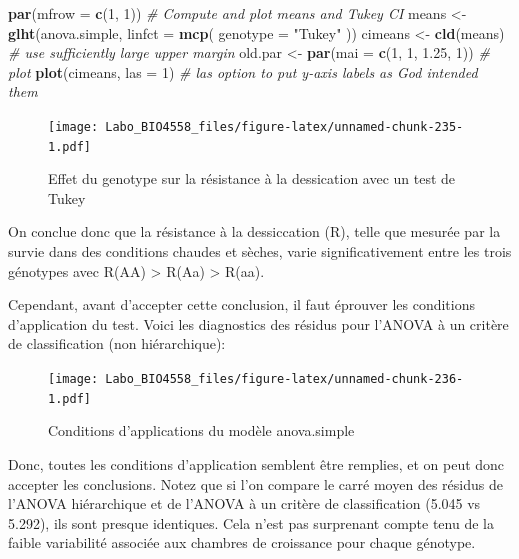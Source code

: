 \documentclass[
  12pt,
]{book}
\newenvironment{Shaded}{\begin{snugshade}}{\end{snugshade}}
\newcommand{\CommentTok}[1]{\textcolor[rgb]{0.56,0.35,0.01}{\textit{#1}}}
\newcommand{\DataTypeTok}[1]{\textcolor[rgb]{0.13,0.29,0.53}{#1}}
\newcommand{\DecValTok}[1]{\textcolor[rgb]{0.00,0.00,0.81}{#1}}
\newcommand{\FloatTok}[1]{\textcolor[rgb]{0.00,0.00,0.81}{#1}}
\newcommand{\KeywordTok}[1]{\textcolor[rgb]{0.13,0.29,0.53}{\textbf{#1}}}
\newcommand{\NormalTok}[1]{#1}
\newcommand{\StringTok}[1]{\textcolor[rgb]{0.31,0.60,0.02}{#1}}
\begin{document}
\begin{Shaded}
\begin{Highlighting}[]
\KeywordTok{par}\NormalTok{(}\DataTypeTok{mfrow =} \KeywordTok{c}\NormalTok{(}\DecValTok{1}\NormalTok{, }\DecValTok{1}\NormalTok{))}
\CommentTok{\# Compute and plot means and Tukey CI}
\NormalTok{means \textless{}{-}}\StringTok{ }\KeywordTok{glht}\NormalTok{(anova.simple, }\DataTypeTok{linfct =} \KeywordTok{mcp}\NormalTok{(}
  \DataTypeTok{genotype =}
    \StringTok{"Tukey"}
\NormalTok{))}
\NormalTok{cimeans \textless{}{-}}\StringTok{ }\KeywordTok{cld}\NormalTok{(means)}
\CommentTok{\# use sufficiently large upper margin}
\NormalTok{old.par \textless{}{-}}\StringTok{ }\KeywordTok{par}\NormalTok{(}\DataTypeTok{mai =} \KeywordTok{c}\NormalTok{(}\DecValTok{1}\NormalTok{, }\DecValTok{1}\NormalTok{, }\FloatTok{1.25}\NormalTok{, }\DecValTok{1}\NormalTok{))}
\CommentTok{\# plot}
\KeywordTok{plot}\NormalTok{(cimeans, }\DataTypeTok{las =} \DecValTok{1}\NormalTok{) }\CommentTok{\# las option to put y{-}axis labels as God intended them}
\end{Highlighting}
\end{Shaded}

\begin{figure}
\centering
\texttt{[image: Labo\_BIO4558\_files/figure-latex/unnamed-chunk-235-1.pdf]}
\caption{\label{fig:unnamed-chunk-235}Effet du genotype sur la résistance à la dessication avec un test de Tukey}
\end{figure}

On conclue donc que la résistance à la dessiccation (R), telle que mesurée par la survie dans des conditions chaudes et sèches, varie significativement entre les trois génotypes avec R(AA) \textgreater{} R(Aa) \textgreater{} R(aa).

Cependant, avant d'accepter cette conclusion, il faut éprouver les conditions d'application du test. Voici les diagnostics des résidus pour l'ANOVA à un critère de classification (non hiérarchique):

\begin{figure}
\centering
\texttt{[image: Labo\_BIO4558\_files/figure-latex/unnamed-chunk-236-1.pdf]}
\caption{\label{fig:unnamed-chunk-236}Conditions d'applications du modèle anova.simple}
\end{figure}

Donc, toutes les conditions d'application semblent être remplies, et on peut donc accepter les conclusions. Notez que si l'on compare le carré moyen des résidus de l'ANOVA hiérarchique et de l'ANOVA à un critère de classification (5.045 vs 5.292), ils sont presque identiques. Cela n'est pas surprenant compte tenu de la faible variabilité associée aux chambres de croissance pour chaque génotype.
\end{document}
